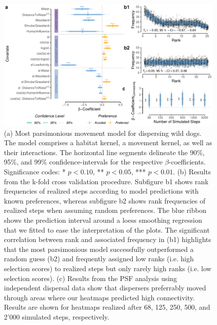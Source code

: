 \documentclass[abstract=on,10pt,a4paper,bibliography=totocnumbered]{article}
\begin{document}
\begin{figure}
  \begin{center}
    \includegraphics[width=\textwidth]{99_MovementModel}
    \caption{(a) Most parsimonious movement model for dispersing wild dogs. The
    model comprises a habitat kernel, a movement kernel, as well as their
    interactions. The horizontal line segments delineate the 90\%, 95\%, and
    99\% confidence-intervals for the respective \(\beta\)-coefficients.
    Significance codes: * \(p < 0.10\), ** \(p < 0.05\), *** \(p < 0.01\). (b)
    Results from the k-fold cross validation procedure. Subfigure b1 shows rank
    frequencies of realized steps according to model predictions with known
    preferences, whereas subfigure b2 shows rank frequencies of realized steps
    when assuming random preferences. The blue ribbon shows the prediction
    interval around a loess smoothing regression that we fitted to ease the
    interpretation of the plots. The significant correlation between rank and
    associated frequency in (b1) highlights that the most parsimonious model
    successfully outperformed a random guess (b2) and frequently assigned low
    ranks (i.e. high selection scores) to realized steps but only rarely high
    ranks (i.e. low selection scores). (c) Results from the PSF analysis using
    independent dispersal data show that dispersers preferrably moved through
    areas where our heatmaps predicted high connectivity. Results are shown for
    heatmaps realized after 68, 125, 250, 500, and 2'000 simulated steps,
    respectively.}
    \label{MovementModel}
  \end{center}
\end{figure}
\end{document}
